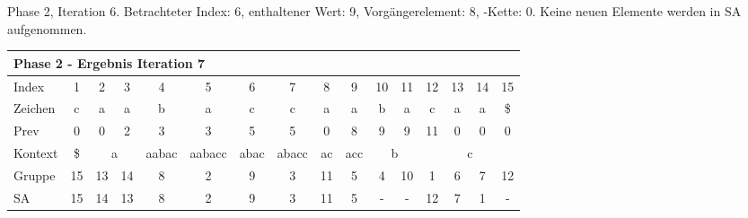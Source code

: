 \begin{table}[H]
\caption[Phase 2, Iteration 6]{Phase 2, Iteration 6. Betrachteter Index: 6, enthaltener Wert: 9, Vorgängerelement: 8, \prevpointer-Kette: 0. Keine neuen Elemente werden in SA aufgenommen.}
\label{table_complex_example_2_6} 
\end{table}

\begin{table}[H]
\centering
\begin{adjustbox}{max width=\textwidth}
\centering
\begin{tabular}{lccccccccccccccc}
\multicolumn{16}{l}{Phase 2 - Ergebnis Iteration 7}                                                                                                                                                                                                                                                                                       \\ \hline
\multicolumn{1}{l|}{Index}   & 1                       & 2  & 3                       & 4                          & 5                           & 6                         & 7                                              & 8                       & 9                        & 10 & 11                      & 12  & 13  & 14  & 15  \\
\multicolumn{1}{l|}{Zeichen} & c                       & a  & a                       & b                          & a                           & c                         & c                                              & a                       & a                        & b  & a                       & c   & a   & a   & \$  \\
\multicolumn{1}{l|}{Prev}    & 0                       & 0  & 2                       & 3                          & 3                           & 5                         & 5                                              & 0                       & 8                        & 9  & 9                       & 11  & 0   & 0   & 0   \\ \hline
\multicolumn{1}{l|}{Kontext} & \multicolumn{1}{c|}{\$} & \multicolumn{2}{c|}{a}       & \multicolumn{1}{c|}{aabac} & \multicolumn{1}{c|}{aabacc} & \multicolumn{1}{c|}{abac} & \multicolumn{1}{c|}{abacc}                     & \multicolumn{1}{c|}{ac} & \multicolumn{1}{c|}{acc} & \multicolumn{2}{c|}{b}       & \multicolumn{4}{c}{c} \\
\multicolumn{1}{l|}{Gruppe}  & \multicolumn{1}{c|}{15} & 13 & \multicolumn{1}{c|}{14} & \multicolumn{1}{c|}{8}     & \multicolumn{1}{c|}{2}      & \multicolumn{1}{c|}{9}    & \multicolumn{1}{c|}{3}                         & \multicolumn{1}{c|}{11} & \multicolumn{1}{c|}{5}   & 4  & \multicolumn{1}{c|}{10} & 1   & 6   & 7   & 12  \\
\multicolumn{1}{l|}{SA}      & \multicolumn{1}{c|}{15} & 14 & \multicolumn{1}{c|}{13} & \multicolumn{1}{c|}{8}     & \multicolumn{1}{c|}{2}      & \multicolumn{1}{c|}{9}    & \multicolumn{1}{c|}{\cellcolor[HTML]{\green}3} & \multicolumn{1}{c|}{11} & \multicolumn{1}{c|}{5}   & -  & \multicolumn{1}{c|}{-}  & 12  & 7   & 1   & -  
\end{tabular}
\end{adjustbox}


\end{table}
